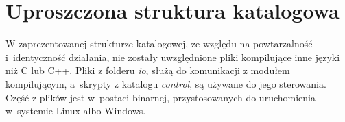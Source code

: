 \section{Uproszczona struktura katalogowa}
W zaprezentowanej strukturze katalogowej, ze względu na powtarzalność i~identyczność działania, nie zostały uwzględnione pliki kompilujące inne języki niż C lub C++. Pliki z folderu \textit{io}, służą do komunikacji z modułem kompilującym, a~skrypty z katalogu \textit{control}, są używane do jego sterowania. Część z plików jest w~postaci binarnej, przystosowanych do uruchomienia w~systemie Linux albo Windows.